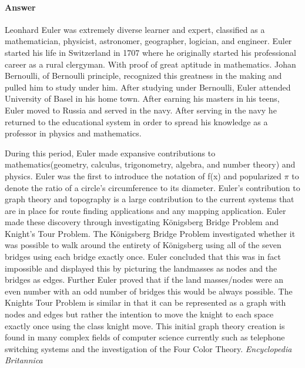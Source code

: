 \documentclass{article}
\begin{document}
\paragraph{Answer}

Leonhard Euler was extremely diverse learner and expert, classified as a
mathematician, physicist, astronomer, geographer, logician, and engineer.
Euler started his life in Switzerland in 1707 where he originally started his
professional career as a rural clergyman. With proof of great aptitude in
mathematics. Johan Bernoulli, of Bernoulli principle, recognized this greatness
in the making and pulled him to study under him. After studying under Bernoulli,
Euler attended University of Basel in his home town. After earning his masters
in his teens, Euler moved to Russia and served in the navy. After serving in the
navy he returned to the educational system in order to spread his knowledge as a
professor in physics and mathematics.

During this period, Euler made expansive contributions to mathematics(geometry,
calculus, trigonometry, algebra, and number theory) and physics. Euler was the
first to introduce the notation of f(x) and popularized $\pi$ to denote the ratio
of a circle's circumference to its diameter. Euler's contribution to graph theory
and topography is a large contribution to the current systems that are in place
for route finding applications and any mapping application. Euler made these
discovery through investigating Königsberg Bridge Problem and Knight's Tour Problem.
The Königsberg Bridge Problem investigated whether it was possible to walk around
the entirety of Königsberg using all of the seven bridges using each bridge exactly
once. Euler concluded that this was in fact impossible and displayed this by picturing
the landmasses as nodes and the bridges as edges. Further Euler proved that if
the land masses/nodes were an even number with an odd number of bridges this
would be always possible. The Knights Tour Problem is similar
in that it can be represented as a graph with nodes and edges but rather the
intention to move the knight to each space exactly once using the class knight
move. This initial graph theory creation is found in many complex fields of computer
science currently such as telephone switching systems and the investigation of
the Four Color Theory.
\emph{Encyclopedia}~\cite{encyclopedia}
\emph{Britannica}~\cite{britannica}


 \newpage
 
 
\end{document}
